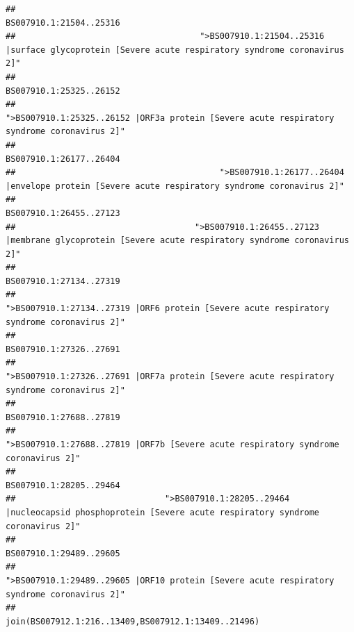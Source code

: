 \documentclass[
]{article}
\begin{document}
\begin{verbatim}
##                                                                                                                BS007910.1:21504..25316 
##                                     ">BS007910.1:21504..25316 |surface glycoprotein [Severe acute respiratory syndrome coronavirus 2]" 
##                                                                                                                BS007910.1:25325..26152 
##                                            ">BS007910.1:25325..26152 |ORF3a protein [Severe acute respiratory syndrome coronavirus 2]" 
##                                                                                                                BS007910.1:26177..26404 
##                                         ">BS007910.1:26177..26404 |envelope protein [Severe acute respiratory syndrome coronavirus 2]" 
##                                                                                                                BS007910.1:26455..27123 
##                                    ">BS007910.1:26455..27123 |membrane glycoprotein [Severe acute respiratory syndrome coronavirus 2]" 
##                                                                                                                BS007910.1:27134..27319 
##                                             ">BS007910.1:27134..27319 |ORF6 protein [Severe acute respiratory syndrome coronavirus 2]" 
##                                                                                                                BS007910.1:27326..27691 
##                                            ">BS007910.1:27326..27691 |ORF7a protein [Severe acute respiratory syndrome coronavirus 2]" 
##                                                                                                                BS007910.1:27688..27819 
##                                                    ">BS007910.1:27688..27819 |ORF7b [Severe acute respiratory syndrome coronavirus 2]" 
##                                                                                                                BS007910.1:28205..29464 
##                              ">BS007910.1:28205..29464 |nucleocapsid phosphoprotein [Severe acute respiratory syndrome coronavirus 2]" 
##                                                                                                                BS007910.1:29489..29605 
##                                            ">BS007910.1:29489..29605 |ORF10 protein [Severe acute respiratory syndrome coronavirus 2]" 
##                                                                                    join(BS007912.1:216..13409,BS007912.1:13409..21496) 

\end{verbatim}
\end{document}
